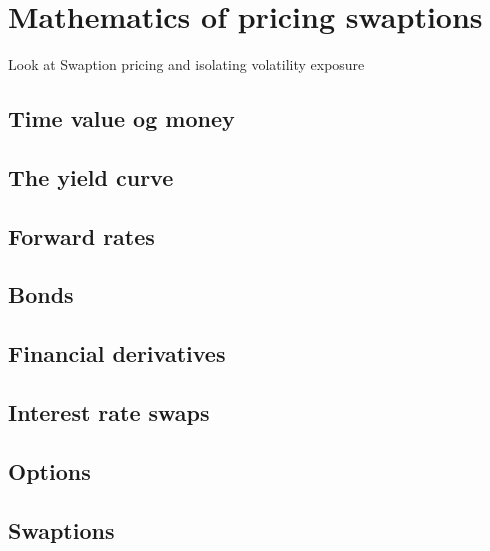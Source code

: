 \section{Mathematics of pricing swaptions}

Look at Swaption pricing and isolating volatility exposure

\subsection{Time value og money}

\subsection{The yield curve}

\subsection{Forward rates}

\subsection{Bonds}

\subsection{Financial derivatives}

\subsection{Interest rate swaps}

\subsection{Options}

\subsection{Swaptions}